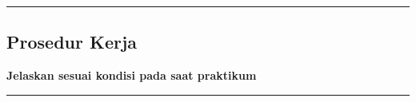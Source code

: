{\color{gray}\hrule}
\begin{center}
\section{Prosedur Kerja}
\textbf{Jelaskan sesuai kondisi pada saat praktikum}
\end{center}
{\color{gray}\hrule}
\begin{multicols}{2}
\lipsum[1-2]
\end{multicols}


